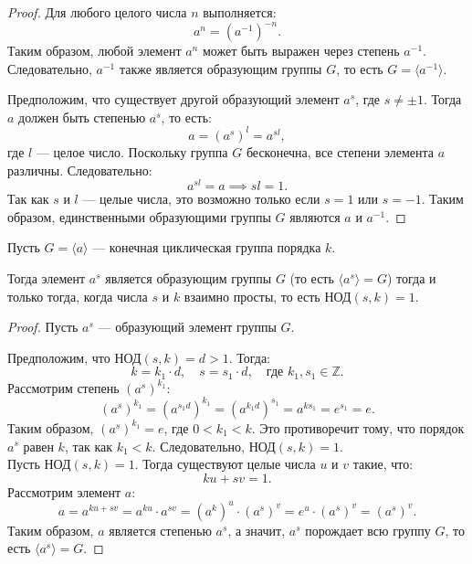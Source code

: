 \begin{proof}
\leavevmode \nl

Для любого целого числа \( n \) выполняется:
\[
a^n = (a^{-1})^{-n}.
\]
Таким образом, любой элемент \( a^n \) может быть выражен через степень \( a^{-1} \). Следовательно, \( a^{-1} \) также является образующим группы \( G \), то есть \( G = \langle a^{-1} \rangle \).

Предположим, что существует другой образующий элемент \( a^s \), где \( s \neq \pm 1 \). Тогда \( a \) должен быть степенью \( a^s \), то есть:
\[
a = (a^s)^l = a^{sl},
\]
где \( l \) — целое число. Поскольку группа \( G \) бесконечна, все степени элемента \( a \) различны. Следовательно:
\[
a^{sl} = a \implies sl = 1.
\]
Так как \( s \) и \( l \) — целые числа, это возможно только если \( s = 1 \) или \( s = -1 \). Таким образом, единственными образующими группы \( G \) являются \( a \) и \( a^{-1} \).
\end{proof}
\vspace{0.2cm}

\begin{shth}
    \begin{theorem} Пусть \( G = \langle a \rangle \) — конечная циклическая группа порядка \( k \). 
    
    Тогда элемент \( a^s \) является образующим группы \( G \) (то есть \( \langle a^s \rangle = G \)) тогда и только тогда, когда числа \( s \) и \( k \) взаимно просты, то есть \( \text{НОД}(s, k) = 1 \).
    \end{theorem}
\end{shth}

\begin{proof}
\leavevmode \nl


\boxed{\Longrightarrow} Пусть \( a^s \) — образующий элемент группы \( G \). 

Предположим, что \( \text{НОД}(s, k) = d > 1 \). Тогда:
\[
k = k_1 \cdot d, \quad s = s_1 \cdot d, \quad \text{где } k_1, s_1 \in \mathbb{Z}.
\]
Рассмотрим степень \( (a^s)^{k_1} \):
\[
(a^s)^{k_1} = (a^{s_1 d})^{k_1} = (a^{k_1 d})^{s_1} = a^{k s_1} = e^{s_1} = e.
\]
Таким образом, \( (a^s)^{k_1} = e \), где \( 0 < k_1 < k \). Это противоречит тому, что порядок \( a^s \) равен \( k \), так как \( k_1 < k \). Следовательно, \( \text{НОД}(s, k) = 1 \).
\\

\boxed{\Longleftarrow} Пусть \( \text{НОД}(s, k) = 1 \). Тогда существуют целые числа \( u \) и \( v \) такие, что:
\[
k u + s v = 1.
\]
Рассмотрим элемент \( a \):
\[
a = a^{k u + s v} = a^{k u} \cdot a^{s v} = (a^k)^u \cdot (a^s)^v = e^u \cdot (a^s)^v = (a^s)^v.
\]
Таким образом, \( a \) является степенью \( a^s \), а значит, \( a^s \) порождает всю группу \( G \), то есть \( \langle a^s \rangle = G \).
\end{proof}
